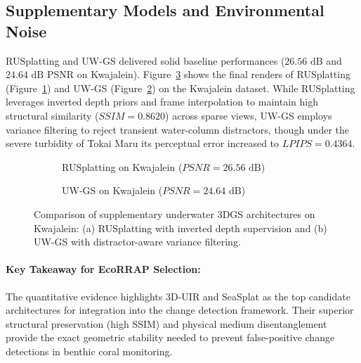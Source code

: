 \subsection{Supplementary Models and Environmental Noise}
RUSplatting and UW-GS delivered solid baseline performances ($26.56\text{ dB}$ and $24.64\text{ dB}$ PSNR on Kwajalein). Figure~\ref{fig:supplementary_models} shows the final renders of RUSplatting (Figure~\ref{fig:rusplatting_kwaj}) and UW-GS (Figure~\ref{fig:uw_gs_kwaj}) on the Kwajalein dataset. While RUSplatting leverages inverted depth priors and frame interpolation to maintain high structural similarity ($SSIM = 0.8620$) across sparse views, UW-GS employs variance filtering to reject transient water-column distractors, though under the severe turbidity of Tokai Maru its perceptual error increased to $LPIPS = 0.4364$.

\begin{figure}[htbp]
    \centering
    \begin{subfigure}[b]{0.48\textwidth}
        \centering
        \caption{RUSplatting on Kwajalein ($PSNR = 26.56\text{ dB}$)}
        \label{fig:rusplatting_kwaj}
    \end{subfigure}
    \hfill
    \begin{subfigure}[b]{0.48\textwidth}
        \centering
        \caption{UW-GS on Kwajalein ($PSNR = 24.64\text{ dB}$)}
        \label{fig:uw_gs_kwaj}
    \end{subfigure}
    \caption{Comparison of supplementary underwater 3DGS architectures on Kwajalein: (a) RUSplatting with inverted depth supervision and (b) UW-GS with distractor-aware variance filtering.}
    \label{fig:supplementary_models}
\end{figure}

\paragraph{Key Takeaway for EcoRRAP Selection:} The quantitative evidence highlights 3D-UIR and SeaSplat as the top candidate architectures for integration into the change detection framework. Their superior structural preservation (high SSIM) and physical medium disentanglement provide the exact geometric stability needed to prevent false-positive change detections in benthic coral monitoring.


